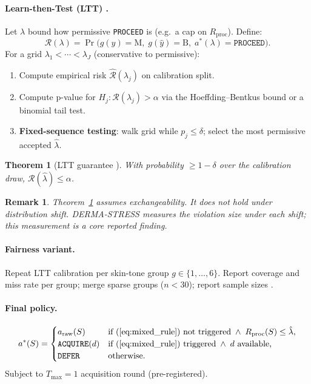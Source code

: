 \documentclass[conference]{IEEEtran}
\newtheorem{theorem}{Theorem}
\newtheorem{remark}{Remark}
\newcommand{\1}{\mathbf{1}}
\newcommand{\calR}{\mathcal{R}}
\begin{document}
\paragraph{Learn-then-Test (LTT) \cite{angelopoulos2021ltt}.}
Let $\lambda$ bound how permissive \texttt{PROCEED} is
(e.g.\ a cap on $R_{\text{proc}}$). Define:
\begin{equation}
  \calR(\lambda) = \Pr\bigl(g(y){=}\text{M},\;
    g(\hat{y}){=}\text{B},\; a^*(\lambda){=}\texttt{PROCEED}\bigr).
  \label{eq:risk}
\end{equation}
For a grid $\lambda_1 < \cdots < \lambda_J$ (conservative to permissive):
\begin{enumerate}[leftmargin=*]
  \item Compute empirical risk $\hat{\calR}(\lambda_j)$ on calibration split.
  \item Compute p-value for $H_j:\calR(\lambda_j)>\alpha$
        via the Hoeffding--Bentkus bound or a binomial tail test.
  \item \textbf{Fixed-sequence testing}: walk grid while $p_j\leq\delta$;
        select the most permissive accepted $\hat{\lambda}$.
\end{enumerate}

\begin{theorem}[LTT guarantee \cite{angelopoulos2021ltt}]
With probability $\geq 1-\delta$ over the calibration draw,
$\calR(\hat{\lambda}) \leq \alpha$.
\label{thm:ltt}
\end{theorem}

\begin{remark}
Theorem~\ref{thm:ltt} assumes exchangeability. It does \emph{not} hold
under distribution shift. DERMA-STRESS measures the violation size under
each shift; this measurement is a core reported finding.
\end{remark}

\paragraph{Fairness variant.}
Repeat LTT calibration per skin-tone group $g\in\{1,\ldots,6\}$.
Report coverage and miss rate per group; merge sparse groups ($n<30$);
report sample sizes \cite{lu2021fair}.

\paragraph{Final policy.}
\begin{equation}
  a^*(S) =
  \begin{cases}
    a_{\text{raw}}(S) & \text{if (\ref{eq:mixed_rule}) not triggered}
                        \;\wedge\; R_{\text{proc}}(S) \leq \hat{\lambda},\\
    \texttt{ACQUIRE}(d) & \text{if (\ref{eq:mixed_rule}) triggered}
                          \;\wedge\; d \text{ available,}\\
    \texttt{DEFER} & \text{otherwise.}
  \end{cases}
  \label{eq:final_policy}
\end{equation}
Subject to $T_{\max}=1$ acquisition round (pre-registered).
\end{document}
